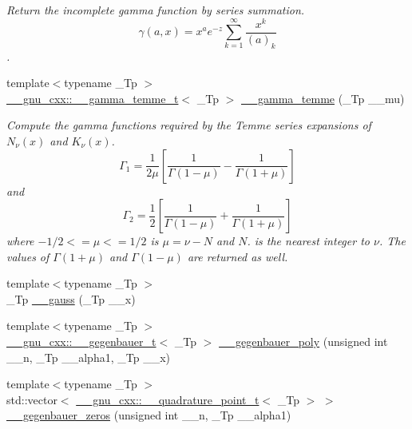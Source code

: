 \begin{DoxyCompactItemize}
\begin{DoxyCompactList}\small\item\em Return the incomplete gamma function by series summation. \[ \gamma(a,x) = x^a e^{-z}\sum_{k=1}^{\infty} \frac{x^k}{(a)_k} \]. \end{DoxyCompactList}\item 
{\footnotesize template$<$typename \+\_\+\+Tp $>$ }\\\hyperlink{struct____gnu__cxx_1_1____gamma__temme__t}{\+\_\+\+\_\+gnu\+\_\+cxx\+::\+\_\+\+\_\+gamma\+\_\+temme\+\_\+t}$<$ \+\_\+\+Tp $>$ \hyperlink{namespacestd_1_1____detail_a0d4fa90f527fd05d057b27ba0366488a}{\+\_\+\+\_\+gamma\+\_\+temme} (\+\_\+\+Tp \+\_\+\+\_\+mu)
\begin{DoxyCompactList}\small\item\em Compute the gamma functions required by the Temme series expansions of $ N_\nu(x) $ and $ K_\nu(x) $. \[ \Gamma_1 = \frac{1}{2\mu} \left[\frac{1}{\Gamma(1 - \mu)} - \frac{1}{\Gamma(1 + \mu)}\right] \] and \[ \Gamma_2 = \frac{1}{2} \left[\frac{1}{\Gamma(1 - \mu)} + \frac{1}{\Gamma(1 + \mu)}\right] \] where $ -1/2 <= \mu <= 1/2 $ is $ \mu = \nu - N $ and $ N $. is the nearest integer to $ \nu $. The values of $ \Gamma(1 + \mu) $ and $ \Gamma(1 - \mu) $ are returned as well. \end{DoxyCompactList}\item 
{\footnotesize template$<$typename \+\_\+\+Tp $>$ }\\\+\_\+\+Tp \hyperlink{namespacestd_1_1____detail_afdb25beb2328b74d64d9be03de64c442}{\+\_\+\+\_\+gauss} (\+\_\+\+Tp \+\_\+\+\_\+x)
\item 
{\footnotesize template$<$typename \+\_\+\+Tp $>$ }\\\hyperlink{struct____gnu__cxx_1_1____gegenbauer__t}{\+\_\+\+\_\+gnu\+\_\+cxx\+::\+\_\+\+\_\+gegenbauer\+\_\+t}$<$ \+\_\+\+Tp $>$ \hyperlink{namespacestd_1_1____detail_a95571fd8bb2ab2400136ab368a858963}{\+\_\+\+\_\+gegenbauer\+\_\+poly} (unsigned int \+\_\+\+\_\+n, \+\_\+\+Tp \+\_\+\+\_\+alpha1, \+\_\+\+Tp \+\_\+\+\_\+x)
\item 
{\footnotesize template$<$typename \+\_\+\+Tp $>$ }\\std\+::vector$<$ \hyperlink{struct____gnu__cxx_1_1____quadrature__point__t}{\+\_\+\+\_\+gnu\+\_\+cxx\+::\+\_\+\+\_\+quadrature\+\_\+point\+\_\+t}$<$ \+\_\+\+Tp $>$ $>$ \hyperlink{namespacestd_1_1____detail_adb195fa4e0feab7b1380260e7f56f061}{\+\_\+\+\_\+gegenbauer\+\_\+zeros} (unsigned int \+\_\+\+\_\+n, \+\_\+\+Tp \+\_\+\+\_\+alpha1)
\item 

\end{DoxyCompactItemize}
